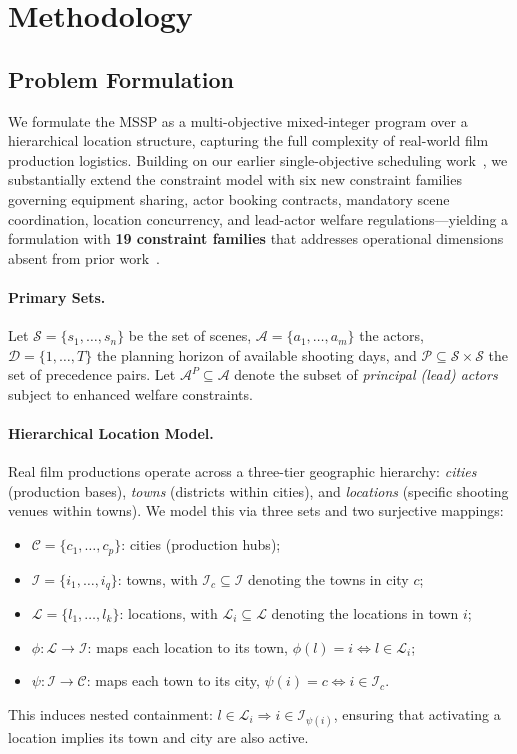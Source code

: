 \section{Methodology}
\label{sec:methodology}

\subsection{Problem Formulation}
\label{sec:formulation}

We formulate the MSSP as a multi-objective mixed-integer program over a hierarchical location structure, capturing the full complexity of real-world film production logistics.
Building on our earlier single-objective scheduling work~\citep{vjlaxmi2024}, we substantially extend the constraint model with six new constraint families governing equipment sharing, actor booking contracts, mandatory scene coordination, location concurrency, and lead-actor welfare regulations---yielding a formulation with \textbf{19 constraint families} that addresses operational dimensions absent from prior work~\citep{liu2019,tekin2023}.

\paragraph{Primary Sets.}
Let $\mathcal{S} = \{s_1, \ldots, s_n\}$ be the set of scenes, $\mathcal{A} = \{a_1, \ldots, a_m\}$ the actors, $\mathcal{D} = \{1, \ldots, T\}$ the planning horizon of available shooting days, and $\mathcal{P} \subseteq \mathcal{S} \times \mathcal{S}$ the set of precedence pairs.
Let $\mathcal{A}^P \subseteq \mathcal{A}$ denote the subset of \emph{principal (lead) actors} subject to enhanced welfare constraints.

\paragraph{Hierarchical Location Model.}
Real film productions operate across a three-tier geographic hierarchy: \emph{cities} (production bases), \emph{towns} (districts within cities), and \emph{locations} (specific shooting venues within towns).
We model this via three sets and two surjective mappings:
\begin{itemize}
    \item $\mathcal{C} = \{c_1, \ldots, c_p\}$: cities (production hubs);
    \item $\mathcal{I} = \{i_1, \ldots, i_q\}$: towns, with $\mathcal{I}_c \subseteq \mathcal{I}$ denoting the towns in city $c$;
    \item $\mathcal{L} = \{l_1, \ldots, l_k\}$: locations, with $\mathcal{L}_i \subseteq \mathcal{L}$ denoting the locations in town $i$;
    \item $\phi: \mathcal{L} \to \mathcal{I}$: maps each location to its town, $\phi(l) = i \iff l \in \mathcal{L}_i$;
    \item $\psi: \mathcal{I} \to \mathcal{C}$: maps each town to its city, $\psi(i) = c \iff i \in \mathcal{I}_c$.
\end{itemize}
This induces nested containment: $l \in \mathcal{L}_i \Rightarrow i \in \mathcal{I}_{\psi(i)}$, ensuring that activating a location implies its town and city are also active.

